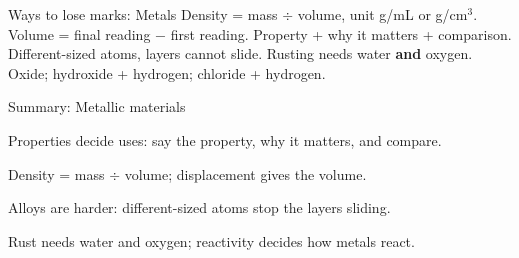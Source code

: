 \documentclass[aspectratio=169,11pt,xcolor=table]{beamer}
\begin{document}
\begin{frame}{Ways to lose marks: Metals}
\relax
{} Density = mass $\div$ volume, unit g/mL or g/cm$^{3}$.
 Volume = final reading $-$ first reading.
 Property + why it matters + comparison.
 Different-sized atoms, layers cannot slide.
 Rusting needs water \textbf{and} oxygen.
 Oxide; hydroxide + hydrogen; chloride + hydrogen.
\end{frame}

\begin{frame}{Summary: Metallic materials}
\relax
\vspace{4mm}
{\renewcommand\baselinestretch{1.3}\sSum
Properties decide uses: say the property, why it matters, and compare.\par\vspace{3mm}
Density = mass $\div$ volume; displacement gives the volume.\par\vspace{3mm}
Alloys are harder: different-sized atoms stop the layers sliding.\par\vspace{3mm}
Rust needs water and oxygen; reactivity decides how metals react.\par}
\end{frame}
\end{document}
